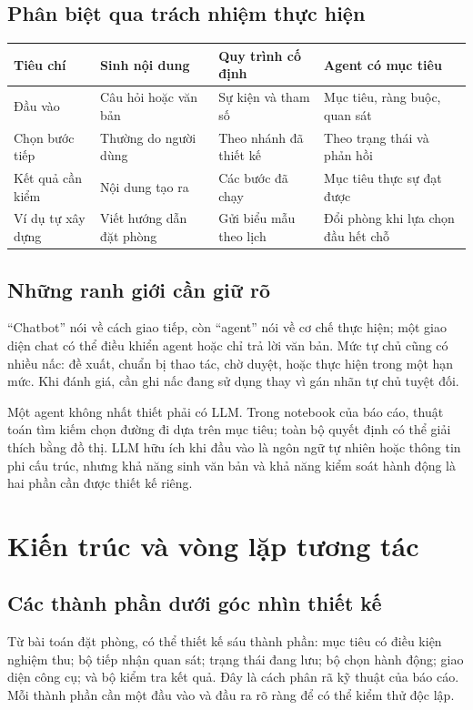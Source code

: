 \documentclass[12pt,a4paper]{article}
\begin{document}
\subsection{Phân biệt qua trách nhiệm thực hiện}
\begin{center}\small
\begin{tabularx}{\linewidth}{@{}p{2.8cm}XXX@{}}
\toprule
\textbf{Tiêu chí} & \textbf{Sinh nội dung} & \textbf{Quy trình cố định} & \textbf{Agent có mục tiêu}\\
\midrule
Đầu vào & Câu hỏi hoặc văn bản & Sự kiện và tham số & Mục tiêu, ràng buộc, quan sát\\
Chọn bước tiếp & Thường do người dùng & Theo nhánh đã thiết kế & Theo trạng thái và phản hồi\\
Kết quả cần kiểm & Nội dung tạo ra & Các bước đã chạy & Mục tiêu thực sự đạt được\\
Ví dụ tự xây dựng & Viết hướng dẫn đặt phòng & Gửi biểu mẫu theo lịch & Đổi phòng khi lựa chọn đầu hết chỗ\\
\bottomrule
\end{tabularx}
\end{center}

\subsection{Những ranh giới cần giữ rõ}
``Chatbot'' nói về cách giao tiếp, còn ``agent'' nói về cơ chế thực hiện; một giao diện
chat có thể điều khiển agent hoặc chỉ trả lời văn bản. Mức tự chủ cũng có nhiều nấc:
đề xuất, chuẩn bị thao tác, chờ duyệt, hoặc thực hiện trong một hạn mức. Khi đánh giá,
cần ghi nấc đang sử dụng thay vì gán nhãn tự chủ tuyệt đối.

Một agent không nhất thiết phải có LLM. Trong notebook của báo cáo, thuật toán tìm kiếm
chọn đường đi dựa trên mục tiêu; toàn bộ quyết định có thể giải thích bằng đồ thị.
LLM hữu ích khi đầu vào là ngôn ngữ tự nhiên hoặc thông tin phi cấu trúc, nhưng khả năng
sinh văn bản và khả năng kiểm soát hành động là hai phần cần được thiết kế riêng.

\par
\section{Kiến trúc và vòng lặp tương tác}
\subsection{Các thành phần dưới góc nhìn thiết kế}
Từ bài toán đặt phòng, có thể thiết kế sáu thành phần: mục tiêu có điều kiện nghiệm thu;
bộ tiếp nhận quan sát; trạng thái đang lưu; bộ chọn hành động; giao diện công cụ;
và bộ kiểm tra kết quả. Đây là cách phân rã kỹ thuật của báo cáo. Mỗi thành phần cần
một đầu vào và đầu ra rõ ràng để có thể kiểm thử độc lập.
\end{document}
